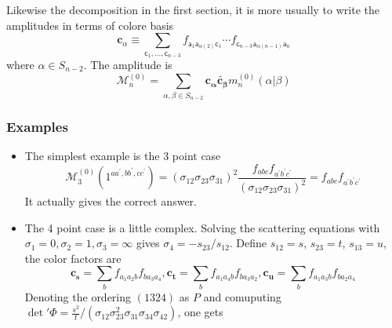 \documentclass{beamer}
\begin{document}
\begin{frame}
    Likewise the decomposition in the first section, it is more usually to write the amplitudes in terms of colore basis
    \begin{equation*}
        \boxed{\mathbf{c}_\alpha\equiv\sum_{\mathsf{c}_1,...,\mathsf{c}_{n-3}}f_{\mathsf{a}_1\mathsf{a}_{\alpha(2)}\mathsf{c}_1}\cdots f_{\mathsf{c}_{n-3}\mathsf{a}_{\alpha(n-1)}\mathsf{a}_n}}
    \end{equation*}
    where $\alpha \in S_{n-2}$. The amplitude is 
    \begin{equation*}
        \mathcal{M}_n^{(0)}=\sum_{\alpha,\beta\in S_{n-2}}\mathbf{c_\alpha}\tilde{\mathbf{c_\beta}}m_{n}^{(0)}(\alpha|\beta)
    \end{equation*}
\end{frame}
\begin{frame}
    \frametitle{Examples}
    \begin{itemize}
        \item The simplest example is the 3 point case
        \begin{equation*}
            \mathcal{M}_3^{(0)}(1^{aa^\prime,bb^\prime,cc^\prime})=(\sigma_{12}\sigma_{23}\sigma_{31})^2\frac{f_{abc}f_{a^\prime b^\prime c^\prime}}{(\sigma_{12}\sigma_{23}\sigma_{31})^2}=f_{abc}f_{a^\prime b^\prime c^\prime}
        \end{equation*}
        It actually gives the correct answer.
        \item The 4 point case is a little complex. Solving the scattering equations with $\sigma_1=0,\sigma_2=1,\sigma_3=\infty$ gives $\sigma_4=-s_{23}/s_{12}$. Define
        $s_{12}=s$, $s_{23}=t$, $s_{13}=u$, the color factors are 
        \begin{equation*}
            \mathbf{c_s}=\sum_bf_{a_1a_2b}f_{ba_3a_4},\mathbf{c_t}=\sum_bf_{a_1a_4b}f_{ba_3a_2},\mathbf{c_u}=\sum_bf_{a_1a_3b}f_{ba_2a_4}
        \end{equation*}
        Denoting the ordering $(1324)$ as $P$ and comuputing $\det{'}\Phi=\frac{s^2}{t}/(\sigma_{12}\sigma_{23}^2\sigma_{31}\sigma_{34}\sigma_{42})$, one gets
    \end{itemize}
\end{frame}
\end{document}

